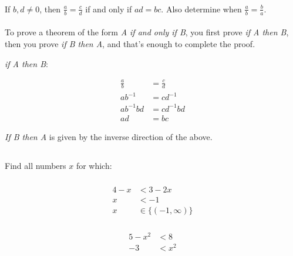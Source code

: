 \documentclass[12pt]{article}
\begin{document}
\subsubsection{}
If $b,d \neq 0$, then $\frac{a}{b} = \frac{c}{d}$ if and only if $ad=bc$. Also determine when $\frac{a}{b}=\frac{b}{a}$.\\\\
To prove a theorem of the form \emph{A if and only if B}, you first prove \emph{if A then B}, then you prove \emph{if B then A}, and that's enough to complete the proof.

\emph{if A then B}:

\begin{equation*}
\begin{split}
\frac{a}{b} &= \frac{c}{d}\\
ab^{-1} &= cd^{-1}\\
ab^{-1}bd &= cd^{-1}bd\\
ad &= bc
\end{split}
\end{equation*}

\emph{If B then A} is given by the inverse direction of the above.

\subsection{}
Find all numbers $x$ for which:

\subsubsection{}

\begin{equation*}
\begin{split}
4 - x &< 3 - 2x\\
x &<-1\\
x &\in \{(-1, \infty)\}
\end{split}
\end{equation*}

\subsubsection{}

\begin{equation*}
\begin{split}
5-x^2&<8\\
-3 &< x^2
\end{split}
\end{equation*}
\end{document}
